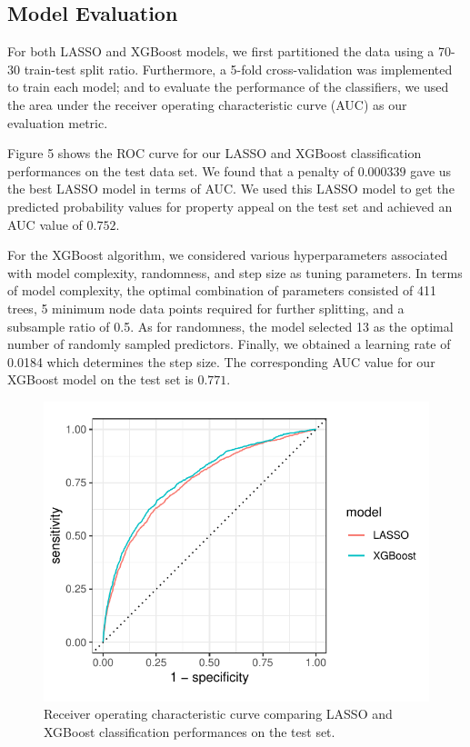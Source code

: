\documentclass[
  12pt,
]{article}
\begin{document}
\hypertarget{model-evaluation}{%
\subsection{Model Evaluation}\label{model-evaluation}}

For both LASSO and XGBoost models, we first partitioned the data using a
70-30 train-test split ratio. Furthermore, a 5-fold cross-validation was
implemented to train each model; and to evaluate the performance of the
classifiers, we used the area under the receiver operating
characteristic curve (AUC) as our evaluation metric.

Figure 5 shows the ROC curve for our LASSO and XGBoost classification
performances on the test data set. We found that a penalty of
\(0.000339\) gave us the best LASSO model in terms of AUC. We used this
LASSO model to get the predicted probability values for property appeal
on the test set and achieved an AUC value of \(0.752\).

For the XGBoost algorithm, we considered various hyperparameters
associated with model complexity, randomness, and step size as tuning
parameters. In terms of model complexity, the optimal combination of
parameters consisted of 411 trees, 5 minimum node data points required
for further splitting, and a subsample ratio of 0.5. As for randomness,
the model selected 13 as the optimal number of randomly sampled
predictors. Finally, we obtained a learning rate of 0.0184 which
determines the step size. The corresponding AUC value for our XGBoost
model on the test set is \(0.771\).

\begin{figure}[H]

{\centering \includegraphics{unnamed-chunk-7-1} 

}

\caption{Receiver operating characteristic curve comparing LASSO and XGBoost classification performances on the test set.}\label{fig:unnamed-chunk-7}
\end{figure}
\end{document}
